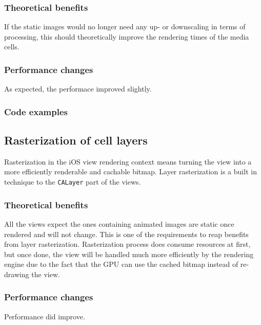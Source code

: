 \documentclass[a4paper,12pt]{article}
\begin{document}
\subsubsection*{Theoretical benefits}
If the static images would no longer need any up- or downscaling in terms of processing, this should theoretically improve the rendering times of the media cells.

\subsubsection*{Performance changes}
As expected, the performace improved slightly.


\subsubsection*{Code examples}

\subsection{Rasterization of cell layers}
Rasterization in the iOS view rendering context means turning the view into a more efficiently renderable and cachable bitmap. Layer rasterization is a built in technique to the \texttt{CALayer} part of the views.

\subsubsection*{Theoretical benefits}
All the views expect the ones containing animated images are static once rendered and will not change. This is one of the requirements to reap benefits from layer rasterization. Rasterization process does consume resources at first, but once done, the view will be handled much more efficiently by the rendering engine due to the fact that the GPU can use the cached bitmap instead of re-drawing the view.\cite{MovingPixelsOntoTheScreen}

\subsubsection*{Performance changes}
Performance did improve.
\end{document}
